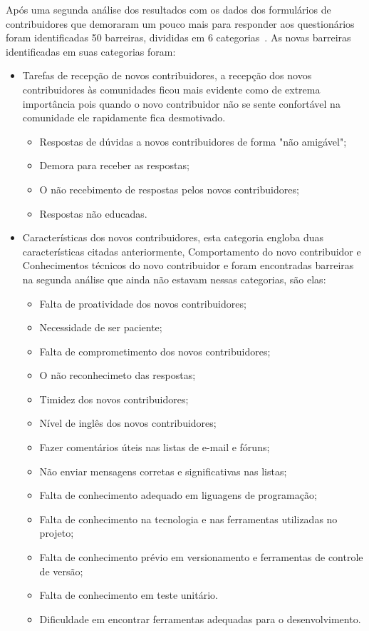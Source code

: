 Após uma segunda análise dos resultados com os dados dos formulários de contribuidores 
que demoraram um pouco mais para responder aos questionários foram identificadas 
50 barreiras, divididas em 6 categorias~\cite{6943482}. As novas barreiras identificadas
em suas categorias foram:

\begin{itemize}

\item Tarefas de recepção de novos contribuidores, a recepção dos novos contribuidores às 
comunidades ficou mais evidente como de extrema importância pois quando o novo 
contribuidor não se sente confortável na comunidade ele rapidamente fica desmotivado.
	\begin{itemize}
	\item Respostas de dúvidas a novos contribuidores de forma "não amigável";
	\item Demora para receber as respostas;
	\item O não recebimento de respostas pelos novos contribuidores;
	\item Respostas não educadas.
	\end{itemize}

\item Características dos novos contribuidores, esta categoria engloba duas características
citadas anteriormente, Comportamento do novo contribuidor e Conhecimentos técnicos do novo
contribuidor e foram encontradas barreiras na segunda análise que ainda não estavam nessas
categorias, são elas:

	\begin{itemize}
	\item Falta de proatividade dos novos contribuidores;
	\item Necessidade de ser paciente;
	\item Falta de comprometimento dos novos contribuidores;
	\item O não reconhecimeto das respostas;
	\item Timidez dos novos contribuidores;
	\item Nível de inglês dos novos contribuidores;
	\item Fazer comentários úteis nas listas de e-mail e fóruns;
	\item Não enviar mensagens corretas e significativas nas listas;
	\item Falta de conhecimento adequado em liguagens de programação;
	\item Falta de conhecimento na tecnologia e nas ferramentas utilizadas no projeto;
	\item Falta de conhecimento prévio em versionamento e ferramentas de controle de 
versão;
	\item Falta de conhecimento em teste unitário.
	\item Dificuldade em encontrar ferramentas adequadas para o desenvolvimento.
	\end{itemize}
 

\end{itemize}
